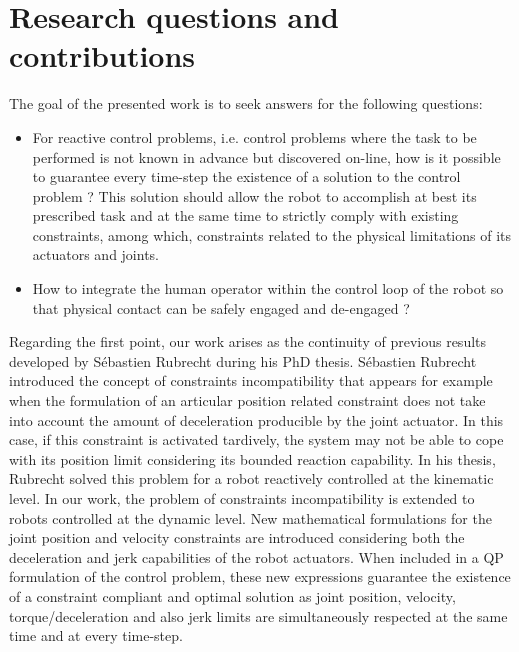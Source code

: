 \section{Research questions and contributions}
The goal of the presented work is to seek answers for the following questions: 
\begin{itemize}
\item For reactive control problems, i.e. control problems where the task to be performed is not known in advance but discovered on-line, how is it possible to guarantee every time-step the existence of a solution to the control problem ? This solution should allow the robot to accomplish at best its prescribed task and at the same time to strictly comply with existing constraints, among which, constraints related to the physical limitations of its actuators and joints.
\item How to integrate the human operator within the control loop of the robot so that physical contact can be safely engaged and de-engaged ? 
\end{itemize} 
Regarding the first point, our work arises as the continuity of previous results developed by Sébastien Rubrecht during his PhD thesis.
Sébastien Rubrecht introduced the concept of constraints incompatibility that appears for example when the formulation of an articular position related constraint does not take into account the amount of deceleration producible by the joint actuator. In this case, if this constraint is activated tardively, the system may not be able to cope with its position limit considering its bounded reaction capability. In his thesis, Rubrecht solved this problem for a robot reactively controlled at the kinematic level. In our work, the problem of constraints incompatibility is extended to robots controlled at the dynamic level. New mathematical formulations for the joint position and velocity constraints are introduced considering both the deceleration and jerk capabilities of the robot actuators. When included in a QP formulation of the control problem, these new expressions guarantee the existence of a constraint compliant and optimal solution as joint position, velocity, torque/deceleration and also jerk limits are simultaneously respected at the same time and at every time-step. \\

